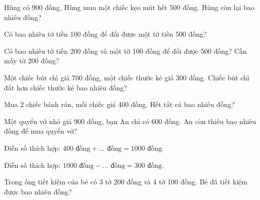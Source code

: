 \begin{ex}
Hùng có 900 đồng, Hùng mua một chiếc kẹo mút hết 500 đồng. Hùng còn lại bao nhiêu đồng?
\end{ex}

\begin{ex}
Có bao nhiêu tờ tiền 100 đồng để đổi được một tờ tiền 500 đồng?
\end{ex}

\begin{ex}
Có bao nhiêu tờ tiền 200 đồng và một tờ 100 đồng để đổi được 500 đồng? Cần mấy tờ 200 đồng?
\end{ex}

\begin{ex}
Một chiếc bút chì giá 700 đồng, một chiếc thước kẻ giá 300 đồng. Chiếc bút chì đắt hơn chiếc thước kẻ bao nhiêu đồng?
\end{ex}

\begin{ex}
Mua 2 chiếc bánh rán, mỗi chiếc giá 400 đồng. Hết tất cả bao nhiêu đồng?
\end{ex}

\begin{ex}
Một quyển vở nhỏ giá 900 đồng, bạn An chỉ có 600 đồng. An còn thiếu bao nhiêu đồng để mua quyển vở?
\end{ex}

\begin{ex}
Điền số thích hợp: $400\text{ đồng} + \dots\text{ đồng} = 1000\text{ đồng}$.
\end{ex}

\begin{ex}
Điền số thích hợp: $1000\text{ đồng} - \dots\text{ đồng} = 300\text{ đồng}$.
\end{ex}

\begin{ex}
Trong ống tiết kiệm của bé có 3 tờ 200 đồng và 4 tờ 100 đồng. Bé đã tiết kiệm được bao nhiêu đồng?
\end{ex}

